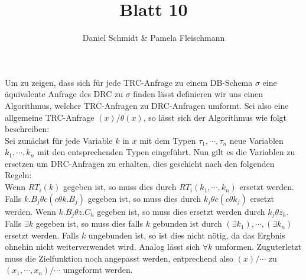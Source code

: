 \documentclass[12pt,a4paper]{amsart}
\begin{document}
\title{Blatt 10}

\author{Daniel Schmidt \& Pamela Fleischmann}

\maketitle

\begin{aufgabe1}
Um zu zeigen, dass sich für jede TRC-Anfrage zu einem DB-Schema $\sigma$ eine äquivalente Anfrage des DRC zu $\sigma$ finden lässt definieren wir uns einen Algorithmus, welcher TRC-Anfragen zu DRC-Anfragen umformt.
Sei also eine allgemeine TRC-Anfrage $(x) / \theta(x)$, so lässt sich der Algorithmus wie folgt beschreiben: \\
Sei zunächst für jede Variable $k$ in $x$ mit dem Typen $\tau_1, \cdots, \tau_n$ neue Variablen $k_1, \cdots, k_n$ mit den entsprechenden Typen eingeführt. Nun gilt es die Variablen zu ersetzen um DRC-Anfragen zu erhalten, dies geschieht nach den folgenden Regeln: \\
Wenn $RT_i(k)$ gegeben ist, so muss dies durch $RT_i(k_1, \cdots, k_n)$ ersetzt werden.
Falls $k.B_j \theta c(c \theta k.B_j)$ gegeben ist, so muss dies durch $k_j \theta c(c \theta k_j)$ ersetzt werden.
Wenn $k.B_j \theta z.C_h$ gegeben ist, so muss dies ersetzt werden durch $k_j \theta z_h$. \\
Falls $\exists k$ gegeben ist, so muss dies falls $k$ gebunden ist durch $(\exists k_1), \cdots, (\exists k_n)$ ersetzt werden. Falls $k$ ungebunden ist, so ist dies nicht nötig, da das Ergbnis ohnehin nicht weiterverwendet wird.
Analog lässt sich $\forall k$ umformen.
Zuguterletzt muss die Zielfunktion noch angepasst werden, entprechend also $(x) / \cdots$ zu $(x_1, \cdots, x_n) / \cdots$ umgeformt werden.
\end{aufgabe1}

\begin{aufgabe1}
\end{aufgabe1}
\end{document}
